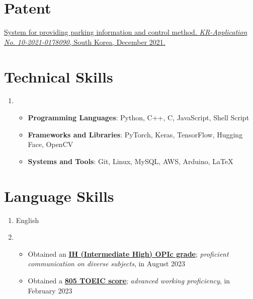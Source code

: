 \documentclass[letterpaper,11pt]{article}
\begin{document}
    \section{Patent}
    \begin{enumerate}[noitemsep, leftmargin=*,label={[\arabic*]}]
        \item{\href{https://doi.org/10.8080/1020210178090}{System for providing parking information and control method. \textit{KR-Application No. 10-2021-0178090}, South Korea, December 2021.}}
    \end{enumerate}
    
    \section{Technical Skills}
    \begin{enumerate}[noitemsep, leftmargin=*,label=]
        \item{
            \begin{itemize}[label=\bullet]
                \item{\textbf{Programming Languages}: Python, C++, C, JavaScript, Shell Script}
                \item{\textbf{Frameworks and Libraries}: PyTorch, Keras, TensorFlow, Hugging Face, OpenCV}
                \item{\textbf{Systems and Tools}: Git, Linux, MySQL, AWS, Arduino, \LaTeX}
            \end{itemize}
        }
    \end{enumerate}
    
    \section{Language Skills}    
    \begin{enumerate}[noitemsep, leftmargin=*,label=]
        \item{English}
        \item{
            \begin{itemize}[label=\bullet]
                \item{Obtained an \textbf{\href{https://oneonlee.github.io/my/certificate/OPIc_Score_Report.pdf}{IH (Intermediate High) OPIc grade}}; \textit{proficient communication on diverse subjects}, in August 2023}
                \item{Obtained a \textbf{\href{https://oneonlee.github.io/my/certificate/TOEIC_OFFICIAL_SCORE_CERTIFICATE.pdf}{805 TOEIC score}}; \textit{advanced working proficiency}, in February 2023}
            \end{itemize}
        }
    \end{enumerate}
\end{document}
